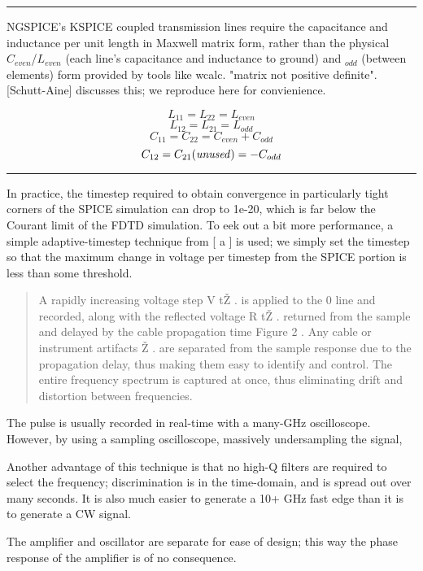 \documentclass[paper.tex]{subfiles}
\begin{document}
\rule{\linewidth}{0.2pt}

NGSPICE's KSPICE coupled transmission lines require the capacitance and inductance per unit length in Maxwell matrix form, rather than the physical $C_{even}$/$L_{even}$ (each line's capacitance and inductance to ground) and $_{odd}$ (between elements) form provided by tools like wcalc. "matrix not positive definite". [Schutt-Aine] discusses this; we reproduce here for convienience.

\[ L_{11} = L_{22} = L_{even}  \]
\[ L_{12} = L_{21} = L_{odd}  \]
\[ C_{11} = C_{22} = C_{even}+C_{odd}  \]
\[ C_{12} = C_{21} {\it{(unused)}} = -C_{odd}  \]

\rule{\linewidth}{0.2pt}

In practice, the timestep required to obtain convergence in particularly tight corners of the SPICE simulation can drop to 1e-20, which is far below the Courant limit of the FDTD simulation. To eek out a bit more performance, a simple adaptive-timestep technique from [ a ] is used; we simply set the timestep so that the maximum change in voltage per timestep from the SPICE portion is less than 
some threshold.



\begin{quote}
A rapidly increasing voltage step V tŽ . is applied to the 0
line and recorded, along with the reflected voltage R tŽ .
returned from the sample and delayed by the cable propagation time Figure 2 . Any cable or instrument artifacts Ž .
are separated from the sample response due to the propagation delay, thus making them easy to identify and control. The entire frequency spectrum is captured at once,
thus eliminating drift and distortion between frequencies.
\end{quote}

The pulse is usually recorded in real-time with a many-GHz oscilloscope. However, by using a sampling oscilloscope, massively undersampling the signal,

Another advantage of this technique is that no high-Q filters are required to select the frequency;
discrimination is in the time-domain, and is spread out over many seconds. It is also much easier to generate a 10+ GHz fast edge than it is to generate a CW signal.




The amplifier and oscillator are separate for ease of design; this way the phase response of the amplifier is of no consequence. 
\end{document}
